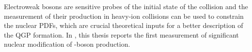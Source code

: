 Electroweak bosons are sensitive probes of the initial state of the collision and the measurement of their production in heavy-ion collisions can be used to constrain the nuclear PDFs, which are crucial theoretical inputs for a better description of the QGP formation. In , this thesis reports the first measurement of significant nuclear modification of \Wb-boson production.

